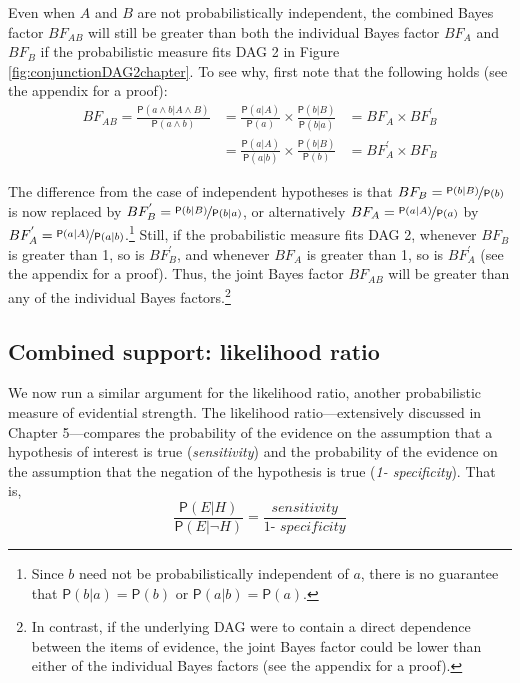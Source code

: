 \documentclass[
  10pt,
  dvipsnames,enabledeprecatedfontcommands]{scrartcl}
\newcommand{\pr}[1]{\ensuremath{\mathsf{P}(#1)}}
\begin{document}
Even when \(A\) and \(B\) are not probabilistically independent, the
combined Bayes factor \(BF_{AB}\) will still be greater than both the
individual Bayes factor \(BF_{A}\) and \(BF_{B}\) if the probabilistic
measure fits \textsf{DAG 2} in Figure \ref{fig:conjunctionDAG2chapter}.
To see why, first note that the following holds (see the appendix for a
proof): \begin{align}
BF_{AB} = \frac{\pr{a \wedge b\vert A\wedge B}}{\pr{a \wedge b}}&= \frac{\pr{a |A}}{\pr{a}} \times \frac{\pr{b |B}}{\pr{b|a}}&=  BF_{A}\times BF^{'}_{B} \nonumber \\
 & = \frac{\pr{a |A}}{\pr{a | b}} \times \frac{\pr{b |B}}{\pr{b}}& =  BF^{'}_{A}\times BF_{B}  \nonumber 
 \end{align}

\noindent The difference from the case of independent hypotheses is that
\(BF_B=\nicefrac{\pr{b \vert B}}{\pr{b}}\) is now replaced by
\(BF^{'}_B=\nicefrac{\pr{b \vert B}}{\pr{b\vert a}}\), or alternatively
\(BF_A=\nicefrac{\pr{a \vert A}}{\pr{a}}\) by
\(BF^{'}_A=\nicefrac{\pr{a \vert A}}{\pr{a\vert b}}\).\footnote{Since
  \(b\) need not be probabilistically independent of \(a\), there is no
  guarantee that \(\pr{b \vert a}=\pr{b}\) or \(\pr{a \vert b}=\pr{a}\).}
Still, if the probabilistic measure fits \textsf{DAG 2}, whenever
\(BF_B\) is greater than 1, so is \(BF^{'}_B\), and whenever \(BF_A\) is
greater than 1, so is \(BF^{'}_A\) (see the appendix for a proof). Thus,
the joint Bayes factor \(BF_{AB}\) will be greater than any of the
individual Bayes factors.\footnote{In contrast, if the underlying
  \textsf{DAG} were to contain a direct dependence between the items of
  evidence, the joint Bayes factor could be lower than either of the
  individual Bayes factors (see the appendix for a proof).}

\hypertarget{combined-support-likelihood-ratio}{%
\subsection{Combined support: likelihood
ratio}\label{combined-support-likelihood-ratio}}

We now run a similar argument for the likelihood ratio, another
probabilistic measure of evidential strength. The likelihood
ratio---extensively discussed in Chapter 5---compares the probability of
the evidence on the assumption that a hypothesis of interest is true
(\textit{sensitivity}) and the probability of the evidence on the
assumption that the negation of the hypothesis is true
(\textit{1- specificity}). That is,
\[\frac{\pr{E \vert H}}{\pr{E \vert \neg H}}=\frac{\textit{sensitivity}}{\textit{1- specificity}}\]
\end{document}

